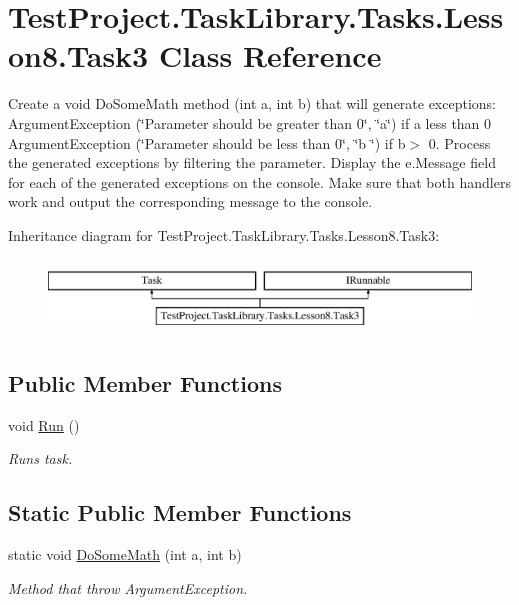 \hypertarget{class_test_project_1_1_task_library_1_1_tasks_1_1_lesson8_1_1_task3}{}\section{Test\+Project.\+Task\+Library.\+Tasks.\+Lesson8.\+Task3 Class Reference}
\label{class_test_project_1_1_task_library_1_1_tasks_1_1_lesson8_1_1_task3}


Create a void Do\+Some\+Math method (int a, int b) that will generate exceptions\+: Argument\+Exception (\char`\"{}\+Parameter should be greater than 0\char`\"{}, \char`\"{}a\char`\"{}) if a less than 0 Argument\+Exception (\char`\"{}\+Parameter should be less than 0\char`\"{}, \char`\"{}b \char`\"{}) if b$>$ 0. Process the generated exceptions by filtering the parameter. Display the e.\+Message field for each of the generated exceptions on the console. Make sure that both handlers work and output the corresponding message to the console.  


Inheritance diagram for Test\+Project.\+Task\+Library.\+Tasks.\+Lesson8.\+Task3\+:\begin{figure}[H]
\begin{center}
\leavevmode
\includegraphics[height=2.000000cm]{class_test_project_1_1_task_library_1_1_tasks_1_1_lesson8_1_1_task3}
\end{center}
\end{figure}
\subsection*{Public Member Functions}
\begin{DoxyCompactItemize}
\item 
void \mbox{\hyperlink{class_test_project_1_1_task_library_1_1_tasks_1_1_lesson8_1_1_task3_a161751513c16ebf362e8d03745568136}{Run}} ()
\begin{DoxyCompactList}\small\item\em Runs task. \end{DoxyCompactList}\end{DoxyCompactItemize}
\subsection*{Static Public Member Functions}
\begin{DoxyCompactItemize}
\item 
static void \mbox{\hyperlink{class_test_project_1_1_task_library_1_1_tasks_1_1_lesson8_1_1_task3_a36a4bb94a00925fd4f42e78bd0132886}{Do\+Some\+Math}} (int a, int b)
\begin{DoxyCompactList}\small\item\em Method that throw Argument\+Exception. \end{DoxyCompactList}\end{DoxyCompactItemize}


